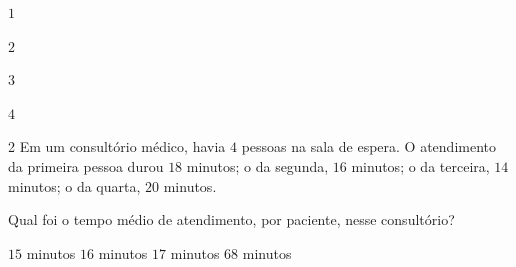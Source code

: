 \begin{escolha}
\item $1$
\item $2$
\item $3$
\item $4$
\end{escolha}



\num{2}  Em um consultório médico, havia $4$ pessoas na sala de espera. O
atendimento da primeira pessoa durou $18$ minutos; o da segunda, $16$
minutos; o da terceira, $14$ minutos; o da quarta, $20$ minutos.

Qual foi o tempo médio de atendimento, por paciente, nesse consultório?

\begin{boxlist}
\boxitem[] $15$ minutos
\boxitem[] $16$ minutos
\boxitem[] $17$ minutos
\boxitem[] $68$ minutos
\end{boxlist}


